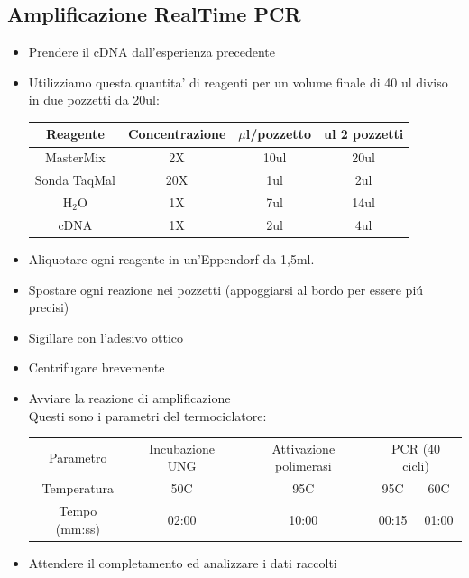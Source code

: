 \documentclass{article}
\begin{document}
\subsection{Amplificazione RealTime PCR}
\begin{itemize}
\item Prendere il cDNA dall'esperienza precedente
\item Utilizziamo questa quantita' di reagenti per un volume finale di 40 ul diviso in due pozzetti da 20ul: \\
\begin{tabular}{c c c c}
\hline
Reagente & Concentrazione & $\mu$l/pozzetto & ul 2 pozzetti \\
\hline
MasterMix & 2X & 10ul & 20ul \\
Sonda TaqMal & 20X & 1ul & 2ul \\
H$_2$O & 1X & 7ul & 14ul \\
cDNA & 1X & 2ul & 4ul \\
\end{tabular}
\item Aliquotare ogni reagente in un'Eppendorf da 1,5ml.
\item Spostare ogni reazione nei pozzetti (appoggiarsi al bordo per essere pi\'u precisi)
\item Sigillare con l'adesivo ottico
\item Centrifugare brevemente
\item Avviare la reazione di amplificazione \\
Questi sono i parametri del termociclatore:\\
\begin{tabular}{c c c c c}
\hline
Parametro & Incubazione UNG & Attivazione polimerasi &
\multicolumn{2}{c}{PCR (40 cicli)} \\
Temperatura & 50C & 95C & 95C & 60C \\
Tempo (mm:ss) & 02:00 & 10:00 & 00:15 & 01:00 \\
\end{tabular}
\item Attendere il completamento ed analizzare i dati raccolti
\end{itemize}
\end{document}
